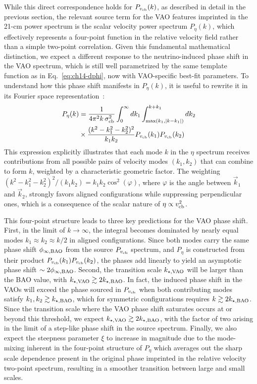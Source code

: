 While this direct correspondence holds for $P_{v_{\rm cb}}(k)$, as described in detail in the previous section, the relevant source term for the VAO features imprinted in the 21-cm power spectrum is the scalar velocity power spectrum $P_\eta(k)$, which effectively represents a four-point function in the relative velocity field rather than a simple two-point correlation. Given this fundamental mathematical distinction, we expect a different response to the neutrino-induced phase shift in the VAO spectrum, which is still well parametrized by the same template function as in Eq.~\eqref{eq:ch14-dphi},  now with VAO-specific best-fit parameters. To understand how this phase shift manifests in $P_\eta(k)$, it is useful to rewrite it in its Fourier space representation~\cite{ferraro12}:
\begin{align}
    P_\eta(k)&=  \frac{1}{4\pi^2k\,\sigma_{\rm cb}^2}\int_0^\infty dk_1 \int_{\max(k_1, |k-k_1|)}^{k+k_1} dk_2  \nonumber \\
    &\times \frac{(k^2 - k_1^2 - k_2^2)^2}{k_1 k_2} P_{v_\mathrm{cb}}(k_1)P_{v_\mathrm{cb}}(k_2)
\end{align}
This expression explicitly illustrates that each mode $k$ in the $\eta$ spectrum receives contributions from all possible pairs of velocity modes $(k_1,k_2)$ that can combine to form $k$,  weighted by a characteristic geometric factor. The weighting $\left(k^2 - k_1^2 -k_2^2\right)^2/\left(k_1 k_2\right) = k_1 k_2\cos^2(\varphi)$, where $\varphi$ is the angle between $\vec{k}_1$
and $\vec{k}_2$, strongly favors aligned configurations while suppressing perpendicular ones, which is a consequence of the scalar nature of $\eta \propto v_{\rm cb}^2$.

This four-point structure leads to three key predictions for the VAO phase shift. First, in the limit of $k\rightarrow \infty$, the integral becomes dominated by nearly equal modes $k_1 \approx k_2 \approx k/2$ in aligned configurations. Since both modes carry the  same phase shift $\phi_{\infty, \rm BAO}$ from the source $P_{v_{\rm cb}}$ spectrum, and $P_\eta$ is constructed from their product $P_{v_{\rm cb}}(k_1)P_{v_{\rm cb}}(k_2)$, the phases add linearly to yield an asymptotic phase shift $\sim 2\phi_{\infty,\rm BAO}$.
Second, the transition scale $k_{\star,\rm VAO}$ will be larger than the BAO value, with $k_{\star,\rm VAO} \gtrsim 2k_{\star, \rm BAO}$. In fact, the induced phase shift in the VAOs will exceed the phase sourced in $P_{v_{\rm cb}}$ when both contributing modes satisfy $k_1, k_2 \gtrsim k_{\star, \rm BAO}$, which for symmetric configurations requires $k \gtrsim 2k_{\star, \rm BAO}$. Since the transition scale where the VAO phase shift saturates occurs at or beyond this threshold, we expect $k_{\star,\rm VAO} \gtrsim 2 k_{\star, \rm BAO}$, with the factor of two arising in the limit of a step-like phase shift in the source spectrum. Finally, we also expect the steepness parameter $\xi$ to increase in magnitude due to the mode-mixing inherent in the four-point structure of $P_\eta$ which averages out the sharp scale dependence present in the original phase imprinted in the relative velocity two-point spectrum, resulting in a smoother transition between large and small scales.

